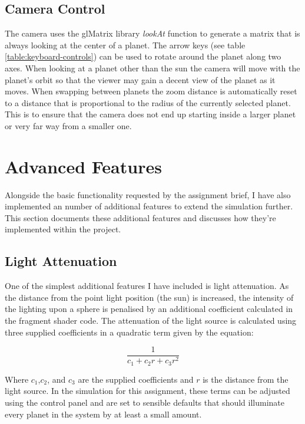 \documentclass[conference]{IEEEtran}
\begin{document}
\subsection{Camera Control}
The camera uses the glMatrix \cite{glmatrix} library \textit{lookAt} function to generate a matrix that is always looking at the center of a planet. The arrow keys (see table \ref{table:keyboard-controls}) can be used to rotate around the planet along two axes. When looking at a planet other than the sun the camera will move with the planet's orbit so that the viewer may gain a decent view of the planet as it moves. When swapping between planets the zoom distance is automatically reset to a distance that is proportional to the radius of the currently selected planet. This is to ensure that the camera does not end up starting inside a larger planet or very far way from a smaller one.

\section{Advanced Features}
\label{sec:advanced-features}
Alongside the basic functionality requested by the assignment brief, I have also implemented an number of additional features to extend the simulation further. This section documents these additional features and discusses how they're implemented within the project.

\subsection{Light Attenuation}
One of the simplest additional features I have included is light attenuation. As the distance from the point light position (the sun) is increased, the intensity of the lighting upon a sphere is penalised by an additional coefficient calculated in the fragment shader code.  The attenuation of the light source is calculated using three supplied coefficients in a  quadratic term given by the equation:

\begin{equation}
\frac{1}{c_1 + c_2r + c_3r^2}
\end{equation}

Where $c_1$,$c_2$, and $c_3$ are the supplied coefficients and $r$ is the distance from the light source. In the simulation for this assignment, these terms can be adjusted using the control panel and are set to sensible defaults that should illuminate every planet in the system by at least a small amount.
\end{document}
